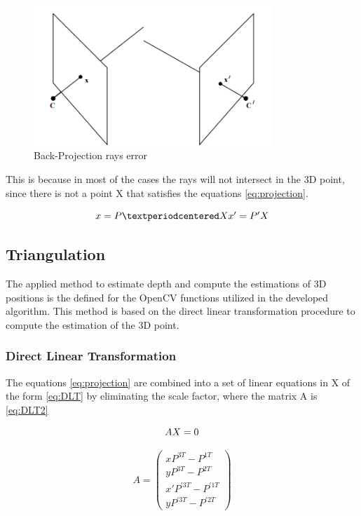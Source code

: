 \begin{figure}[h]
    \centering
   \includegraphics[width=0.8\textwidth]{figures/back_projection}
    \caption{Back-Projection rays error}
    \label{fig:Back-Projection}
\end{figure}

This is because in most of the cases the rays will not intersect in the 3D point, since there is not a point X that satisfies the equations \ref{eq:projection}. 

\begin{equation}
	\centering
	x  = P·X  $$\\
	x' = P'X $$
	\label{eq:projection}
\end{equation} 

\subsection{Triangulation}
The applied method to estimate depth and compute the estimations of 3D positions is the defined for the OpenCV functions utilized in the developed algorithm. 
This method is based on the direct linear transformation procedure to compute the estimation of the 3D point.

\subsubsection{Direct Linear Transformation}
The equations \ref{eq:projection} are combined into a set of linear equations in X of the form \ref{eq:DLT} by eliminating the scale factor, where the matrix A is \ref{eq:DLT2}

\begin{equation}
	\centering
	AX = 0 
	\label{eq:DLT}
\end{equation}

\begin{equation}
A =
 \begin{pmatrix}
  xP^{3T} - P^{1T} \\
  yP^{3T} - P^{2T} \\
  x'P^{'3T} - P^{'1T} \\
  yP^{'3T} - P^{'2T}
 \end{pmatrix}
 \label{eq:DLT2}
\end{equation}

